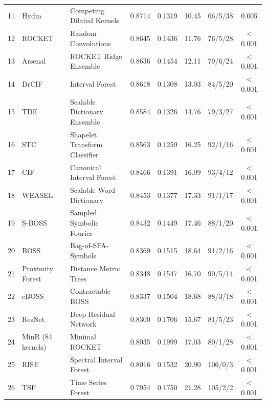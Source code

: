 \begin{table}[t]
\begin{tabular}{cllccccc}
11 & Hydra~\cite{dempster2023hydra} & Competing Dilated Kernels & 0.8714 & 0.1319 & 10.45 & 66/5/38 & 0.005 \\
12 & ROCKET~\cite{dempster2020rocket} & Random Convolutions & 0.8645 & 0.1436 & 11.76 & 76/5/28 & < 0.001 \\
13 & Arsenal~\cite{middlehurst2021hive} & ROCKET Ridge Ensemble & 0.8636 & 0.1454 & 12.11 & 79/6/24 & < 0.001 \\
14 & DrCIF~\cite{middlehurst2021hive} & Interval Forest & 0.8618 & 0.1308 & 13.03 & 84/5/20 & < 0.001 \\
15 & TDE~\cite{middlehurst2021scalable} & Scalable Dictionary Ensemble & 0.8584 & 0.1326 & 14.76 & 79/3/27 & < 0.001 \\
16 & STC~\cite{middlehurst2021hive} & Shapelet Transform Classifier & 0.8563 & 0.1259 & 16.25 & 92/1/16 & < 0.001 \\
17 & CIF~\cite{middlehurst2020canonical} & Canonical Interval Forest & 0.8466 & 0.1391 & 16.09 & 93/4/12 & < 0.001 \\
18 & WEASEL~\cite{schafer2017weasel} & Scalable Word Dictionary & 0.8453 & 0.1377 & 17.33 & 91/1/17 & < 0.001 \\
19 & S-BOSS~\cite{middlehurst2021scalable} & Sampled Symbolic Fourier & 0.8432 & 0.1449 & 17.46 & 88/1/20 & < 0.001 \\
20 & BOSS~\cite{schafer2015boss} & Bag-of-SFA-Symbols & 0.8369 & 0.1515 & 18.64 & 91/2/16 & < 0.001 \\
21 & Proximity Forest~\cite{lucas2019proximity} & Distance Metric Trees & 0.8348 & 0.1547 & 16.70 & 90/5/14 & < 0.001 \\
22 & cBOSS~\cite{middlehurst2021scalable} & Contractable BOSS & 0.8337 & 0.1504 & 18.68 & 88/3/18 & < 0.001 \\
23 & ResNet~\cite{fawaz2019deep} & Deep Residual Network & 0.8300 & 0.1706 & 15.67 & 81/5/23 & < 0.001 \\
24 & MinR (84 kernels)~\cite{dempster2021minirocket} & Minimal ROCKET & 0.8035 & 0.1999 & 17.03 & 80/1/28 & < 0.001 \\
25 & RISE~\cite{lines2018hive} & Spectral Interval Forest & 0.8016 & 0.1532 & 20.90 & 106/0/3 & < 0.001 \\
26 & TSF~\cite{deng2013time} & Time Series Forest & 0.7954 & 0.1750 & 21.28 & 105/2/2 & < 0.001 \\
\bottomrule
\end{tabular}
\end{table}
